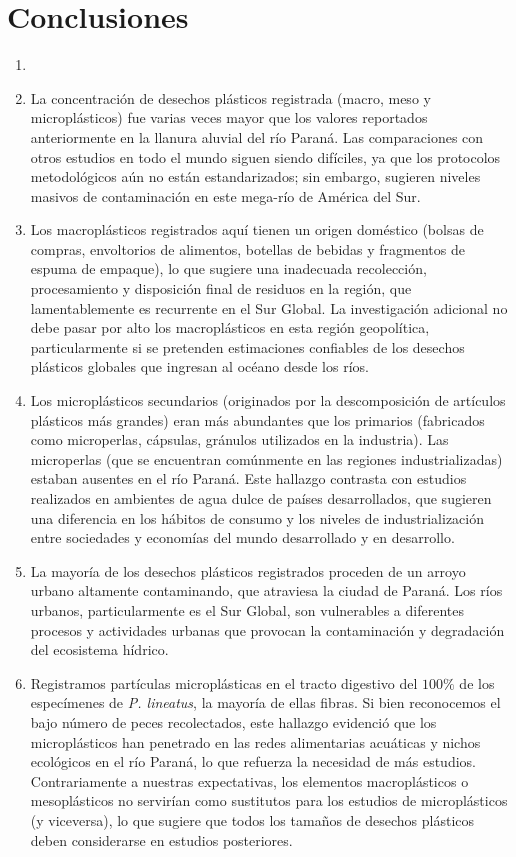 \section{Conclusiones}%
\label{sec:conclusiones}

\begin{enumerate}
	\item \item La concentración de desechos plásticos registrada (macro, meso y microplásticos) fue varias veces mayor que los valores reportados anteriormente en la llanura aluvial del río Paraná. Las comparaciones con otros estudios en todo el mundo siguen siendo difíciles, ya que los protocolos metodológicos aún no están estandarizados; sin embargo, sugieren niveles masivos de contaminación en este mega-río de América del Sur.
	\item Los macroplásticos registrados aquí tienen un origen doméstico (bolsas de compras, envoltorios de alimentos, botellas de bebidas y fragmentos de espuma de empaque), lo que sugiere una inadecuada recolección, procesamiento y disposición final de residuos en la región, que lamentablemente es recurrente en el Sur Global. La investigación adicional no debe pasar por alto los macroplásticos en esta región geopolítica, particularmente si se pretenden estimaciones confiables de los desechos plásticos globales que ingresan al océano desde los ríos.
	\item Los microplásticos secundarios (originados por la descomposición de artículos plásticos más grandes) eran más abundantes que los primarios (fabricados como microperlas, cápsulas, gránulos utilizados en la industria). Las microperlas (que se encuentran comúnmente en las regiones industrializadas) estaban ausentes en el río Paraná. Este hallazgo contrasta con estudios realizados en ambientes de agua dulce de países desarrollados, que sugieren una diferencia en los hábitos de consumo y los niveles de industrialización entre sociedades y economías del mundo desarrollado y en desarrollo.
	\item La mayoría de los desechos plásticos registrados proceden de un arroyo urbano altamente contaminando, que atraviesa la ciudad de Paraná. Los ríos urbanos, particularmente es el Sur Global, son vulnerables a diferentes procesos y actividades urbanas que provocan la contaminación y degradación del ecosistema hídrico.
	\item Registramos partículas microplásticas en el tracto digestivo del $100\%$ de los especímenes de \textit{P. lineatus}, la mayoría de ellas fibras. Si bien reconocemos el bajo número de peces recolectados, este hallazgo evidenció que los microplásticos han penetrado en las redes alimentarias acuáticas y nichos ecológicos en el río Paraná, lo que refuerza la necesidad de más estudios.
	      Contrariamente a nuestras expectativas, los elementos macroplásticos o mesoplásticos no servirían como sustitutos para los estudios de microplásticos (y viceversa), lo que sugiere que todos los tamaños de desechos plásticos deben considerarse en estudios posteriores.
\end{enumerate}

